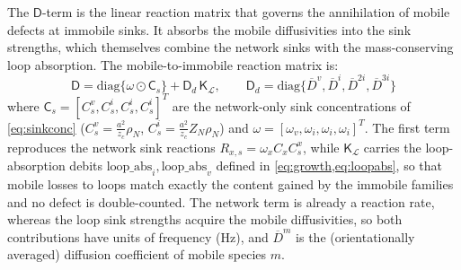 \documentclass{article}
\newcommand{\spvec}[1]{\bm{\mathsf{#1}}}   %
\newcommand{\spmat}[1]{\bm{\mathsf{#1}}}   %
\begin{document}
The $\spmat{D}$-term is the linear reaction matrix that governs the annihilation of mobile defects at immobile sinks. It absorbs the mobile diffusivities into the sink strengths, which themselves combine the network sinks with the mass-conserving loop absorption. The mobile-to-immobile reaction matrix is:
\begin{equation}\label{eq:KM}
\spmat{D}=\mathrm{diag}\{\spvec{\omega}\odot\spvec{C}_s\}+\spmat{D}_d\,\spmat{K}_{\mathcal L},\qquad
\spmat{D}_d=\mathrm{diag}\{\overline{D}^v,\overline{D}^i,\overline{D}^{2i},\overline{D}^{3i}\} 
\end{equation}
where $\spvec{C}_s=[C_s^v,C_s^i,C_s^i,C_s^i]^T$ are the network-only sink concentrations of \cref{eq:sinkconc} ($C_s^v=\tfrac{a^2}{z_c}\rho_N$, $C_s^i=\tfrac{a^2}{z_c}Z_N\rho_N$) and $\spvec{\omega}=[\omega_v,\omega_i,\omega_i,\omega_i]^T$. The first term reproduces the network sink reactions $R_{x,s}=\omega_x C_x C_s^x$, while $\spmat{K}_{\mathcal L}$ carries the loop-absorption debits $\text{loop\_abs}_i,\text{loop\_abs}_v$ defined in \cref{eq:growth,eq:loopabs}, so that mobile losses to loops match exactly the content gained by the immobile families and no defect is double-counted. The network term is already a reaction rate, whereas the loop sink strengths acquire the mobile diffusivities, so both contributions have units of frequency (Hz), and $\overline{D}^m$ is the (orientationally averaged) diffusion coefficient of mobile species $m$.
\end{document}
